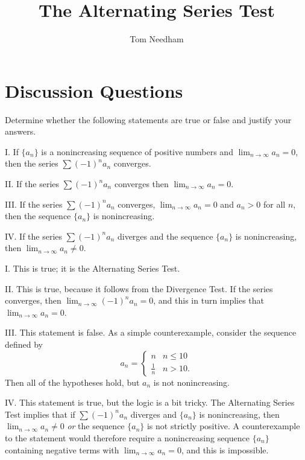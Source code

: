 \documentclass[]{ximera}
\author{Tom Needham}
\title[Collaborate:]{The Alternating Series Test}
\begin{document}
\begin{abstract}
\end{abstract}
\maketitle

\vspace{-.4in}

\section{Discussion Questions}

\begin{problem}
Determine whether the following statements are true or false and justify your answers.

I. If $\{a_n\}$ is a nonincreasing sequence of positive numbers and $\lim_{n\rightarrow \infty} a_n = 0$, then the series $\sum (-1)^n a_n$ converges.

II. If the series $\sum (-1)^n a_n$ converges then $\lim_{n \rightarrow \infty} a_n = 0$.

III. If the series $\sum (-1)^n a_n$ converges, $\lim_{n\rightarrow \infty} a_n = 0$ and $a_n > 0$ for all $n$, then the sequence $\{a_n\}$ is nonincreasing.

IV. If the series $\sum (-1)^n a_n$ diverges and the sequence $\{a_n\}$ is nonincreasing, then $\lim_{n \rightarrow \infty} a_n \neq 0$.

\begin{solution}
I. This is true; it is the Alternating Series Test.

II. This is true, because it follows from the Divergence Test. If the series converges, then $\lim_{n\rightarrow \infty} (-1)^n a_n = 0$, and this in turn implies that $\lim_{n\rightarrow \infty} a_n = 0$.

III. This statement is false. As a simple counterexample, consider the sequence defined by
$$
a_n = \left\{\begin{array}{cc}
n & n \leq 10 \\
\frac{1}{n} & n > 10. \end{array}\right.
$$
Then all of the hypotheses hold, but $a_n$ is not nonincreasing.

IV. This statement is true, but the logic is a bit tricky. The Alternating Series Test implies that if $\sum (-1)^n a_n$ diverges and $\{a_n\}$ is nonincreasing, then $\lim_{n \rightarrow \infty} a_n \neq 0$ \emph{or} the sequence $\{a_n\}$ is not strictly positive. A counterexample to the statement would therefore require a nonincreasing sequence $\{a_n\}$ containing negative terms with $\lim_{n\rightarrow \infty} a_n = 0$, and this is impossible.
\end{solution}
\end{problem}
\end{document}
